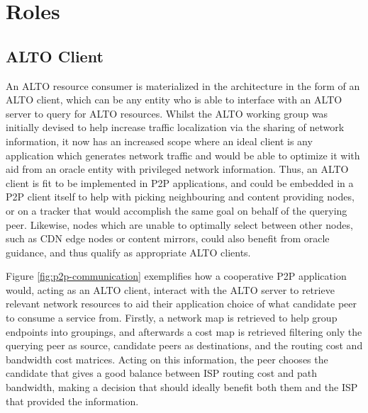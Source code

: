 \section{Roles}

\subsection{ALTO Client}

    An ALTO resource consumer is materialized in the architecture in the form of an ALTO client, which can be any entity who is able to interface with an ALTO server to query for ALTO resources.
    Whilst the ALTO working group was initially devised to help increase traffic localization via the sharing of network information, it now has an increased scope where an ideal client is any application which generates network traffic and would be able to optimize it with aid from an oracle entity with privileged network information.
    Thus, an ALTO client is fit to be implemented in P2P applications, and could be embedded in a P2P client itself to help with picking neighbouring and content providing nodes, or on a tracker that would accomplish the same goal on behalf of the querying peer.
    Likewise, nodes which are unable to optimally select between other nodes, such as CDN edge nodes or content mirrors, could also benefit from oracle guidance, and thus qualify as appropriate ALTO clients.

    Figure \ref{fig:p2p-communication} exemplifies how a cooperative P2P application would, acting as an ALTO client, interact with the ALTO server to retrieve relevant network resources to aid their application choice of what candidate peer to consume a service from.
    Firstly, a network map is retrieved to help group endpoints into groupings, and afterwards a cost map is retrieved filtering only the querying peer as source, candidate peers as destinations, and the routing cost and bandwidth cost matrices.
    Acting on this information, the peer chooses the candidate that gives a good balance between ISP routing cost and path bandwidth, making a decision that should ideally benefit both them and the ISP that provided the information.

